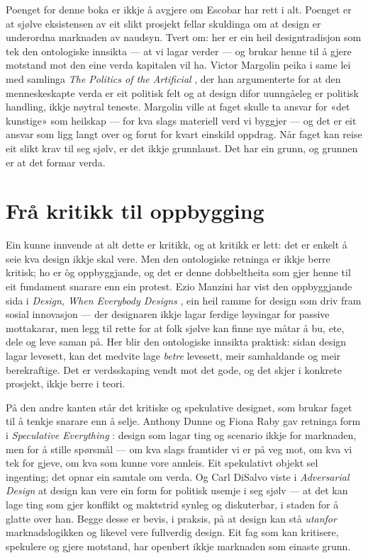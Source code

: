Poenget for denne boka er ikkje å avgjere om Escobar har rett i alt. Poenget er at sjølve eksistensen av eit slikt prosjekt fellar skuldinga om at design er underordna marknaden av naudsyn. Tvert om: her er ein heil designtradisjon som tek den ontologiske innsikta — at vi lagar verder — og brukar henne til å gjere motstand mot den eine verda kapitalen vil ha. Victor Margolin peika i same lei med samlinga \emph{The Politics of the Artificial} \autocite{margolin2002politics}, der han argumenterte for at den menneskeskapte verda er eit politisk felt og at design difor uunngåeleg er politisk handling, ikkje nøytral teneste. Margolin ville at faget skulle ta ansvar for «det kunstige» som heilskap — for kva slags materiell verd vi byggjer — og det er eit ansvar som ligg langt over og forut for kvart einskild oppdrag. Når faget kan reise eit slikt krav til seg sjølv, er det ikkje grunnlaust. Det har ein grunn, og grunnen er at det formar verda.

\section{Frå kritikk til oppbygging}

Ein kunne innvende at alt dette er kritikk, og at kritikk er lett: det er enkelt å seie kva design ikkje skal vere. Men den ontologiske retninga er ikkje berre kritisk; ho er òg oppbyggjande, og det er denne dobbeltheita som gjer henne til eit fundament snarare enn ein protest. Ezio Manzini har vist den oppbyggjande sida i \emph{Design, When Everybody Designs} \autocite{manzini2015}, ein heil ramme for design som driv fram sosial innovasjon — der designaren ikkje lagar ferdige løysingar for passive mottakarar, men legg til rette for at folk sjølve kan finne nye måtar å bu, ete, dele og leve saman på. Her blir den ontologiske innsikta praktisk: sidan design lagar levesett, kan det medvite lage \emph{betre} levesett, meir samhaldande og meir berekraftige. Det er verdsskaping vendt mot det gode, og det skjer i konkrete prosjekt, ikkje berre i teori.

På den andre kanten står det kritiske og spekulative designet, som brukar faget til å tenkje snarare enn å selje. Anthony Dunne og Fiona Raby gav retninga form i \emph{Speculative Everything} \autocite{dunne2013}: design som lagar ting og scenario ikkje for marknaden, men for å stille spørsmål — om kva slags framtider vi er på veg mot, om kva vi tek for gjeve, om kva som kunne vore annleis. Eit spekulativt objekt sel ingenting; det opnar ein samtale om verda. Og Carl DiSalvo viste i \emph{Adversarial Design} \autocite{disalvo2012} at design kan vere ein form for politisk usemje i seg sjølv — at det kan lage ting som gjer konflikt og maktstrid synleg og diskuterbar, i staden for å glatte over han. Begge desse er bevis, i praksis, på at design kan stå \emph{utanfor} marknadslogikken og likevel vere fullverdig design. Eit fag som kan kritisere, spekulere og gjere motstand, har openbert ikkje marknaden som einaste grunn.

